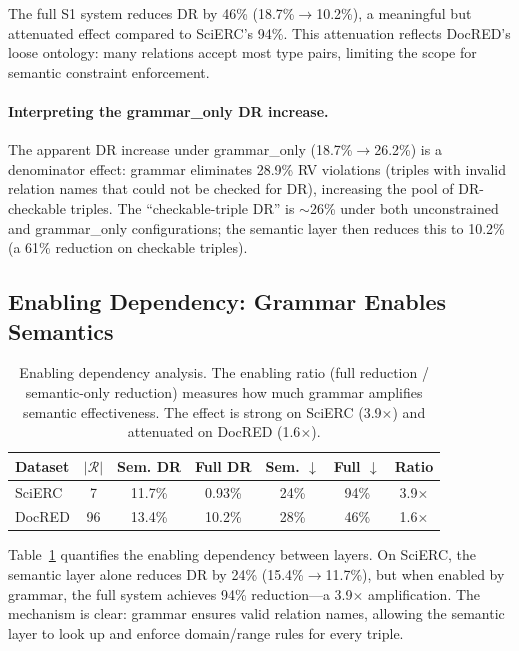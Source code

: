 \documentclass[11pt,a4paper]{article}
\begin{document}
The full S1 system reduces DR by 46\% (18.7\%$\to$10.2\%), a meaningful but attenuated effect compared to SciERC's 94\%.
This attenuation reflects DocRED's loose ontology: many relations accept most type pairs, limiting the scope for semantic constraint enforcement.

\paragraph{Interpreting the grammar\_only DR increase.}
The apparent DR increase under grammar\_only (18.7\%$\to$26.2\%) is a denominator effect: grammar eliminates 28.9\% RV violations (triples with invalid relation names that could not be checked for DR), increasing the pool of DR-checkable triples.
The ``checkable-triple DR'' is $\sim$26\% under both unconstrained and grammar\_only configurations; the semantic layer then reduces this to 10.2\% (a 61\% reduction on checkable triples).

\subsection{Enabling Dependency: Grammar Enables Semantics}

\begin{table}[t]
\centering
\small
\begin{tabular}{lcccccc}
\toprule
\textbf{Dataset} & $|\mathcal{R}|$ & \textbf{Sem. DR} & \textbf{Full DR} & \textbf{Sem. $\downarrow$} & \textbf{Full $\downarrow$} & \textbf{Ratio} \\
\midrule
SciERC & 7 & 11.7\% & 0.93\% & 24\% & 94\% & 3.9$\times$ \\
DocRED & 96 & 13.4\% & 10.2\% & 28\% & 46\% & 1.6$\times$ \\
\bottomrule
\end{tabular}
\caption{Enabling dependency analysis. The enabling ratio (full reduction / semantic-only reduction) measures how much grammar amplifies semantic effectiveness. The effect is strong on SciERC (3.9$\times$) and attenuated on DocRED (1.6$\times$).}
\label{tab:enabling}
\end{table}

Table~\ref{tab:enabling} quantifies the enabling dependency between layers.
On SciERC, the semantic layer alone reduces DR by 24\% (15.4\%$\to$11.7\%), but when enabled by grammar, the full system achieves 94\% reduction---a 3.9$\times$ amplification.
The mechanism is clear: grammar ensures valid relation names, allowing the semantic layer to look up and enforce domain/range rules for every triple.
\end{document}
